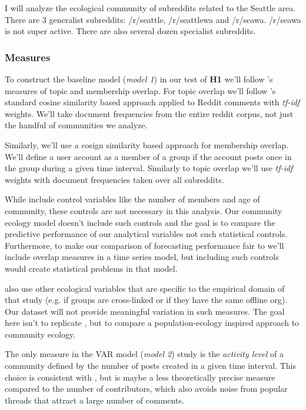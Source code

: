 \documentclass[12pt]{memoir}
\begin{document}
I will analyze the ecological community of subreddits related to the Seattle area.  There are 3 generalist subreddits: /r/seattle, /r/seattlewa and /r/seawa. /r/seawa is not super active.  There are also several dozen specialist subreddits.

 \subsubsection{Measures}
 To construct the baseline model (\emph{model 1}) in our test of \textbf{H1} we'll follow \citet{zhu_selecting_2014}'s measures of topic and membership overlap.  For topic overlap we'll follow \citep{datta_identifying_2017}'s standard cosine similarity based approach applied to Reddit comments with  \emph{tf-idf} weights. We'll take document frequencies from the entire reddit corpus, not just the handful of communities we analyze. 

Similarly, we'll use a cosign similarity based approach for membership overlap.  We'll define a user account as a member of a group if the account posts once in the group during a given time interval. Similarly to topic overlap we'll use \emph{tf-idf} weights with document frequencies taken over all subreddits. 

While \citet{zhu_selecting_2014} include control variables like the number of members and age of community, these controls are not necessary in this analysis. Our community ecology model doesn't include such controls and the goal is to compare the predictive performance of our analytical variables not such statistical controls.  Furthermore, to make our comparison of forecasting performance fair to \citet{zhu_selecting_2014} we'll include overlap measures in a time series model, but including such controls would create statistical problems in that model.

\citet{zhu_impact_2014} also use other ecological variables that are specific to the empirical domain of that study (e.g. if groups are cross-linked or if they have the same offline org). Our dataset will not provide meaningful variation in such measures.  The goal here isn't to replicate \citet{zhu_selecting_2014}, but to compare a population-ecology inspired approach to community ecology.  

The only measure in the VAR model (\emph{model 2}) study is the \emph{activity level} of a community defined by the number of posts created in a given time interval.  This choice is consistent with \citet{zhu_selecting_2014}, but is maybe a less theoretically precise measure compared to the number of contributors, which also avoids noise from popular threads that attract a large number of comments. 
\end{document}
